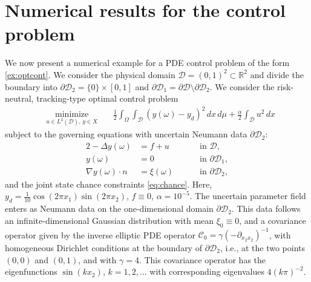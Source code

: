 \documentclass[%
onefignum,onetabnum]{siamonline250211}
\newcommand{\bs}{\mathbf s} \newcommand{\bt}{\mathbf t}
\newcommand{\D}{{\mathcal D}}
\begin{document}
\section{Numerical results for the control problem}\label{SEC:NumCtrl}
We now present a numerical example for a PDE control problem of the form \cref{ex:optcont}. We consider the physical domain $\D=(0,1)^2\subset \mathbb R^2$ and divide the boundary into $\partial \D_2=\{0\}\times [0,1]$ and $\partial \D_1=\partial \D\setminus \partial \D_2$.
We consider the risk-neutral, tracking-type optimal control problem
\begin{equation}\label{eq:ex1-J}
        \begin{aligned}
        & \underset{{u\in L^2(\D), \,y\in X}}{\text{minimize}}\:
        & & %
        \frac 12 \int_\Omega
  \int_\D (y(\omega) - y_d)^2 \,d x\,d\mu
  + \frac\alpha 2 \int_\D u^2\,d x %
        \end{aligned}
\end{equation}
subject to the governing equations with uncertain Neumann data $\partial\D_2$:
\begin{alignat}{2}
  -\Delta y(\omega) &=
  f + u \qquad &&\text{in } \D, \label{eq:state_linear1}\\
  y(\omega)  &= 0  &&\text{in }\partial\D_1, \label{eq:state_linear2}\\
  \nabla y(\omega)\cdot{n} &= \xi(\omega) &&\text{in
  }\partial\D_2, \label{eq:state_linear3}
  \end{alignat}
and the joint state chance constraints \eqref{eq:chance}. 
Here, $y_d = \frac{1}{10} \cos(2\pi
x_1)\sin(2\pi x_2)$, $f\equiv 0$, $\alpha=10^{-5}$. 
The uncertain parameter field enters as Neumann data on the one-dimensional domain
$\partial \D_2$. This data follows an infinite-dimensional Gaussian
distribution with mean $\xi_0 \equiv 0$, and a covariance operator 
given by the inverse elliptic PDE operator $\mathcal C_0 =
\gamma(-\partial_{{x_2 x_2}})^{-1}$, with homogeneous Dirichlet conditions at the boundary of $\partial \D_2$, i.e., at the
two points $(0,0)$ and $(0,1)$, and with $\gamma=4$. This covariance
operator has the eigenfunctions $\sin(k x_2)$, $k=1,2,\ldots$ with
corresponding eigenvalues $4(k\pi)^{-2}$. 
\end{document}
